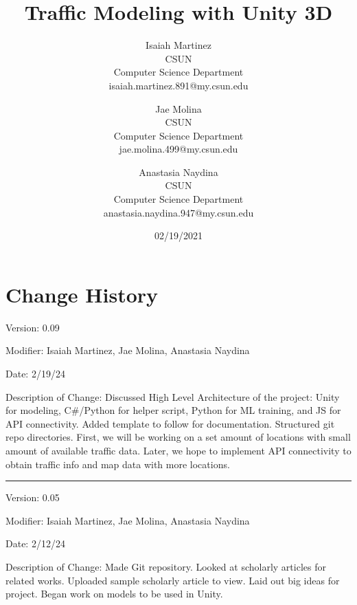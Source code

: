 \documentclass[a4paper,10pt]{article}
\begin{document}
%
    \title{Traffic Modeling with Unity 3D}

    \author{
    
    Isaiah Martinez \\ CSUN \\ Computer Science Department \\ isaiah.martinez.891@my.csun.edu
    
    \and
    
    Jae Molina \\ CSUN \\ Computer Science Department \\ jae.molina.499@my.csun.edu
    
    \and
    
    Anastasia Naydina \\ CSUN \\ Computer Science Department \\ anastasia.naydina.947@my.csun.edu
    
    }
          
    \date{02/19/2021}

    \maketitle
   
    \tableofcontents
 
    \newpage

    \section{Change History}

    Version: 0.09

    Modifier: Isaiah Martinez, Jae Molina, Anastasia Naydina
    
    Date: 2/19/24
    
    Description of Change: Discussed High Level Architecture of the project: Unity for modeling, C\#/Python for helper script, Python for ML training, and JS for API connectivity.
    Added template to follow for documentation.
    Structured git repo directories.
    First, we will be working on a set amount of locations with small amount of available traffic data.
    Later, we hope to implement API connectivity to obtain traffic info and map data with more locations.
 
    \noindent\rule{12cm}{0.4pt}

    Version: 0.05

    Modifier: Isaiah Martinez, Jae Molina, Anastasia Naydina
    
    Date: 2/12/24
    
    Description of Change: Made Git repository. 
    Looked at scholarly articles for related works.
    Uploaded sample scholarly article to view.
    Laid out big ideas for project.
    Began work on models to be used in Unity.

    

    
\end{document}
